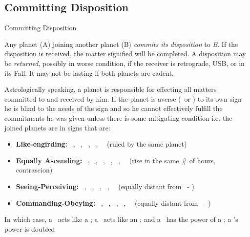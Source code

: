\subsection{Committing Disposition}
\begin{frame}[t]{Committing Disposition}
\small
\begin{block}{}
Any planet (A) joining another planet (B) \textsl{commits its disposition} to \textsl{B}. If the disposition is received, the matter signified will be completed. A disposition may be \textsl{returned}, possibly in worse condition, if the receiver is retrograde, USB, or in its Fall.  It may not be lasting if both planets are cadent.
\end{block}

Astrologically speaking, a planet is responsible for effecting all matters committed to and received by him. If the planet is averse (\Semisextile\ or \Quincunx) to its own sign he is blind to the needs of the sign  and so he cannot effectively fulfill the commitments he was given unless there is some mitigating condition i.e. the joined planets are in signs that are:\footnotemark[1]
\vspace{-0.25cm}
\begin{itemize}
\item \textbf{Like-engirding:}  \Aries\ \Scorpio, \Taurus\  \Libra, \Gemini\ \Virgo, \Sagittarius\ \Pisces,  \Capricorn\ \Aquarius\ (ruled by the same planet)

\item \textbf{Equally Ascending:}  \Aries\ \Pisces, \Taurus\ \Aquarius, \Gemini\ \Capricorn, \Cancer\ \Sagittarius, \Leo\ \Scorpio, \Virgo\ \Libra\ (rise in the same \# of hours, contrascion)

\item \textbf{Seeing-Perceiving:} \Aries\ \Libra, \Taurus\ \Virgo, \Gemini\ \Leo, \Scorpio\ \Pisces, \Sagittarius\ \Aquarius\ (equally distant from \Cancer\ - \Capricorn)

\item \textbf{Commanding-Obeying:} \Taurus\ \Pisces, \Gemini\ \Aquarius, \Cancer\ \Capricorn, \Leo\ \Sagittarius, \Virgo\ \Scorpio\ (equally distant from \Aries\ - \Libra)
\end{itemize}
\vspace{-0.25cm}
In which case, a \Semisextile\ acts like a \Conjunction; a \Quincunx\ acts like an \Opposition; and a \Sextile\ has the power of a \Trine; a \Square's power is doubled

\end{frame}
